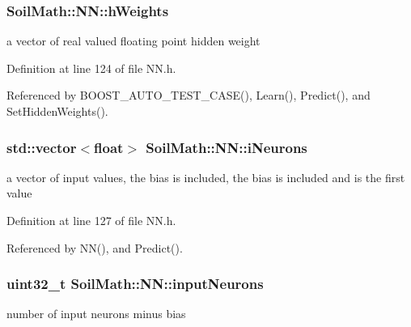\hypertarget{class_soil_math_1_1_n_n_a46db1b2814215509a7345fccc8928efe}{}
\subsubsection[{h\+Weights}]{ Soil\+Math\+::\+N\+N\+::h\+Weights}\label{class_soil_math_1_1_n_n_a46db1b2814215509a7345fccc8928efe}
a vector of real valued floating point hidden weight 

Definition at line 124 of file N\+N.\+h.



Referenced by B\+O\+O\+S\+T\+\_\+\+A\+U\+T\+O\+\_\+\+T\+E\+S\+T\+\_\+\+C\+A\+S\+E(), Learn(), Predict(), and Set\+Hidden\+Weights().

\hypertarget{class_soil_math_1_1_n_n_aa5a6a6014722338fb8af2f79d6187998}{}
\subsubsection[{i\+Neurons}]{\setlength{\rightskip}{0pt plus 5cm}std\+::vector$<$float$>$ Soil\+Math\+::\+N\+N\+::i\+Neurons\hspace{0.3cm}{\ttfamily [private]}}\label{class_soil_math_1_1_n_n_aa5a6a6014722338fb8af2f79d6187998}
a vector of input values, the bias is included, the bias is included and is the first value 

Definition at line 127 of file N\+N.\+h.



Referenced by N\+N(), and Predict().

\hypertarget{class_soil_math_1_1_n_n_a51723ae01e9b0a95c9aa6ac4f4c569fc}{}
\subsubsection[{input\+Neurons}]{\setlength{\rightskip}{0pt plus 5cm}uint32\+\_\+t Soil\+Math\+::\+N\+N\+::input\+Neurons\hspace{0.3cm}{\ttfamily [private]}}\label{class_soil_math_1_1_n_n_a51723ae01e9b0a95c9aa6ac4f4c569fc}
number of input neurons minus bias 

